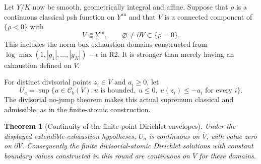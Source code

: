\documentclass[11pt,a4paper]{article}
\numberwithin{equation}{section}
\newtheorem{theorem}{Theorem}[section]
\theoremstyle{definition}
\theoremstyle{remark}
\newcommand{\Cb}{\mathcal C_b}
\newcommand{\an}{\mathrm{an}}
\begin{document}
Let $Y/K$ now be smooth, geometrically integral and affine.
Suppose that $\rho$ is a continuous classical psh function on
$Y^{\an}$ and that $V$ is a connected component of
$\{\rho<0\}$ with
\[
 V\Subset Y^{\an},\qquad
 \varnothing\ne\partial V\subset\{\rho=0\}.
\]
This includes the norm-box exhaustion domains constructed from
$\log\max(1,|g_1|,\ldots,|g_N|)-\epsilon$ in R2. It is stronger
than merely having an exhaustion defined on $V$.

For distinct divisorial points $z_i\in V$ and $a_i\geq0$, let
\[
 U_a=\sup\{u\in\Cb(V):u\text{ is bounded},\ u\leq0,
                         \ u(z_i)\leq-a_i\text{ for every }i\}.
\]
The divisorial no-jump theorem makes this actual supremum
classical and admissible, as in the finite-atomic construction.

\begin{theorem}[Continuity of the finite-point Dirichlet envelopes]
\label{thm:r3-local-atomic-continuity}
Under the displayed extendible-exhaustion hypotheses, $U_a$ is
continuous on $\overline V$, with value zero on $\partial V$.
Consequently the finite divisorial-atomic Dirichlet solutions with
constant boundary values constructed in this round are continuous
on $\overline V$ for these domains.
\end{theorem}
\end{document}
